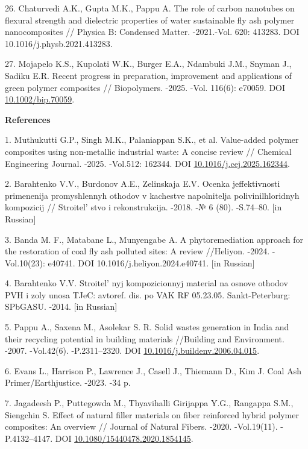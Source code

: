 \begin{refs}
26. Chaturvedi A.K., Gupta M.K., Pappu A. The role of carbon nanotubes on
flexural strength and dielectric properties of water sustainable fly
ash polymer nanocomposites // Physica B: Condensed Matter. -2021.-Vol.
620: 413283. DOI 10.1016/j.physb.2021.413283.

27. Mojapelo K.S., Kupolati W.K., Burger E.A., Ndambuki J.M., Snyman J.,
Sadiku E.R. Recent progress in preparation, improvement and
applications of green polymer composites // Biopolymers. -2025. -Vol.
116(6): e70059. DOI
\href{https://doi.org/10.1002/bip.70059}{10.1002/bip.70059}.
\end{refs}

\begin{center}
{\bfseries References}
\end{center}

\begin{refs}
1. Muthukutti G.P., Singh M.K., Palaniappan S.K., et al. Value-added
polymer composites using non-metallic industrial waste: A concise review
// Chemical Engineering Journal. -2025. -Vol.512: 162344. DOI
\href{https://ui.adsabs.harvard.edu/link_gateway/2025ChEnJ.51262344M/doi:10.1016/j.cej.2025.162344}{10.1016/j.cej.2025.162344}.

2. Barahtenko V.V., Burdonov A.E., Zelinskaja E.V. Ocenka jeffektivnosti
primenenija promyshlennyh othodov v kachestve napolnitelja
polivinilhloridnyh kompozicij // Stroitel' stvo i
rekonstrukcija. -2018. -№ 6 (80). -S.74--80. {[}in Russian{]}

3. Banda M. F., Matabane L., Munyengabe A. A phytoremediation approach
for the restoration of coal fly ash polluted sites: A review //Heliyon.
-2024. -Vol.10(23): e40741. DOI 10.1016/j.heliyon.2024.e40741. {[}in
Russian{]}

4. Barahtenko V.V. Stroitel' nyj kompozicionnyj material
na osnove othodov PVH i zoly unosa TJeC: avtoref. dis. po VAK RF
05.23.05. Sankt-Peterburg: SPbGASU. -2014. {[}in Russian{]}

5. Pappu A., Saxena M., Asolekar S. R. Solid wastes generation in India
and their recycling potential in building materials //Building and
Environment. -2007. -Vol.42(6). -P.2311--2320. DOI
\href{https://doi.org/10.1016/j.buildenv.2006.04.015}{10.1016/j.buildenv.2006.04.015}.

6. Evans L., Harrison P., Lawrence J., Casell J., Thiemann D., Kim J.
Coal Ash Primer/Earthjustice. -2023. -34 p.

7. Jagadeesh P., Puttegowda M., Thyavihalli Girijappa Y.G., Rangappa
S.M., Siengchin S. Effect of natural filler materials on fiber
reinforced hybrid polymer composites: An overview // Journal of Natural
Fibers. -2020. -Vol.19(11). -P.4132--4147. DOI
\href{https://doi.org/10.1080/15440478.2020.1854145}{10.1080/15440478.2020.1854145}.


\end{refs}
